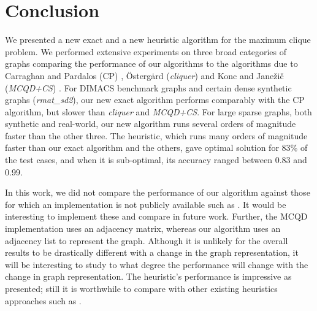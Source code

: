 \section{Conclusion}
\label{sec:conclusion}

We presented a new exact and a new heuristic algorithm for the maximum clique problem.
We performed extensive experiments on three broad categories of graphs comparing the 
performance of our algorithms to the algorithms due to
Carraghan and Pardalos (CP) \cite{pardalos},
\"{O}sterg\.{a}rd ({\it cliquer}) \cite{ostergard} and
Konc and Jane\v{z}i\v{c} ({\it MCQD+CS}) \cite{konc2007improved}.
For DIMACS benchmark graphs and certain dense synthetic graphs ({\it rmat\_sd2}), our new exact algorithm performs comparably with the CP algorithm, but slower than {\it cliquer}
and {\it MCQD+CS}. 
For large sparse graphs, both synthetic and real-world, our new algorithm runs
several orders of magnitude faster than the other three. 
The heuristic, which runs many orders of magnitude faster than our exact algorithm and the others, gave optimal solution for 83\% of the test cases, and when it is sub-optimal, its accuracy ranged between 0.83 and 0.99.

In this work, we did not compare the performance of our algorithm against those for which an implementation is not publicly available such as \cite{walcom,AAAI101611}. It would be interesting to implement these and compare in future work. Further, the MCQD implementation uses an adjacency matrix, whereas our algorithm uses an adjacency list to represent the graph. Although it is unlikely for the overall results to be drastically different with a change in the graph representation, it will be interesting to study to what degree the performance will change with
the change in graph representation.
The heuristic's performance is impressive as presented; still it is worthwhile
to compare with other existing heuristics approaches such as \cite{heu1,heu2}. 
